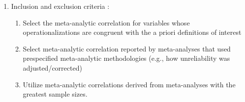 \documentclass[
]{book}
\begin{document}
\begin{enumerate}
  \begin{enumerate}
  \def\labelenumii{\arabic{enumii}.}
  \item
    Chi-square (careful because of its dependent on sample size): since MASEM can have a large number of observations, chi-square usually has poor fit even in cases where the empirical correlation matrix is quite close to the hypothesized model's correlation matrix. \citep{aguinis2009cautionary}. Hence, use other fit indices as well.

    \begin{enumerate}
    \def\labelenumiii{\arabic{enumiii}.}
    \item
      Tests the null hypothesis of exact fit
    \item
      If \(p < 0.05\), exact fit is rejected
    \end{enumerate}
  \item
    Comparative fit index (CFI)
  \item
    Goodness-of-fit index (GFI)
  \item
    Root mean square residual (RMSR): measure of approximate fit

    \begin{enumerate}
    \def\labelenumiii{\arabic{enumiii}.}
    \item
      \textless{} .05 close approximate fit
    \item
      .5 to .8 reasonable fit
    \item
      \textgreater.1 poor fit \citep{browne1992alternative}
    \end{enumerate}
  \item
    Standardized Root Mean Squared Residual (SRMSR)
  \end{enumerate}
\item
  Inclusion and exclusion criteria \citep[p.~482]{bergh2016using}:

  \begin{enumerate}
  \def\labelenumii{\arabic{enumii}.}
  \item
    Select the meta-analytic correlation for variables whose operationalizations are congruent with the a priori definitions of interest
  \item
    Select meta-analytic correlation reported by meta-analyses that used prespecified meta-analytic methodologies (e.g., how unreliability was adjusted/corrected)
  \item
    Utilize meta-analytic correlations derived from meta-analyses with the greatest sample sizes.
  \end{enumerate}
\end{enumerate}
\end{document}
